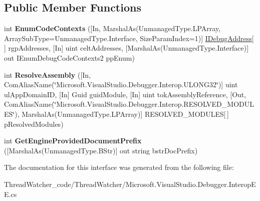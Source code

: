 \subsection*{Public Member Functions}
\begin{DoxyCompactItemize}
\item 
\hypertarget{interface_microsoft_1_1_visual_studio_1_1_debugger_1_1_interop_e_e_1_1_i_debug_engine_symbol_provider_services2_ad5df187c3c5f0352d16e2c643e3d9eb9}{int {\bfseries Enum\+Code\+Contexts} (\mbox{[}In, Marshal\+As(Unmanaged\+Type.\+L\+P\+Array, Array\+Sub\+Type=Unmanaged\+Type.\+Interface, Size\+Param\+Index=1)\mbox{]} \hyperlink{interface_microsoft_1_1_visual_studio_1_1_debugger_1_1_interop_e_e_1_1_i_debug_address}{I\+Debug\+Address}\mbox{[}$\,$\mbox{]} rgp\+Addresses, \mbox{[}In\mbox{]} uint celt\+Addresses, \mbox{[}Marshal\+As(Unmanaged\+Type.\+Interface)\mbox{]} out I\+Enum\+Debug\+Code\+Contexts2 pp\+Enum)}\label{interface_microsoft_1_1_visual_studio_1_1_debugger_1_1_interop_e_e_1_1_i_debug_engine_symbol_provider_services2_ad5df187c3c5f0352d16e2c643e3d9eb9}

\item 
\hypertarget{interface_microsoft_1_1_visual_studio_1_1_debugger_1_1_interop_e_e_1_1_i_debug_engine_symbol_provider_services2_a929a19225cb0ac7acb7fe98a116450b8}{int {\bfseries Resolve\+Assembly} (\mbox{[}In, Com\+Alias\+Name(\char`\"{}Microsoft.\+Visual\+Studio.\+Debugger.\+Interop.\+U\+L\+O\+N\+G32\char`\"{})\mbox{]} uint ul\+App\+Domain\+I\+D, \mbox{[}In\mbox{]} Guid guid\+Module, \mbox{[}In\mbox{]} uint tok\+Assembly\+Reference, \mbox{[}Out, Com\+Alias\+Name(\char`\"{}Microsoft.\+Visual\+Studio.\+Debugger.\+Interop.\+R\+E\+S\+O\+L\+V\+E\+D\+\_\+\+M\+O\+D\+U\+L\+E\+S\char`\"{}), Marshal\+As(Unmanaged\+Type.\+L\+P\+Array)\mbox{]} R\+E\+S\+O\+L\+V\+E\+D\+\_\+\+M\+O\+D\+U\+L\+E\+S\mbox{[}$\,$\mbox{]} p\+Resolved\+Modules)}\label{interface_microsoft_1_1_visual_studio_1_1_debugger_1_1_interop_e_e_1_1_i_debug_engine_symbol_provider_services2_a929a19225cb0ac7acb7fe98a116450b8}

\item 
\hypertarget{interface_microsoft_1_1_visual_studio_1_1_debugger_1_1_interop_e_e_1_1_i_debug_engine_symbol_provider_services2_a4aa45b21ed85b20fd67862f36e6dc414}{int {\bfseries Get\+Engine\+Provided\+Document\+Prefix} (\mbox{[}Marshal\+As(Unmanaged\+Type.\+B\+Str)\mbox{]} out string bstr\+Doc\+Prefix)}\label{interface_microsoft_1_1_visual_studio_1_1_debugger_1_1_interop_e_e_1_1_i_debug_engine_symbol_provider_services2_a4aa45b21ed85b20fd67862f36e6dc414}

\end{DoxyCompactItemize}


The documentation for this interface was generated from the following file\+:\begin{DoxyCompactItemize}
\item 
Thread\+Watcher\+\_\+code/\+Thread\+Watcher/Microsoft.\+Visual\+Studio.\+Debugger.\+Interop\+E\+E.\+cs\end{DoxyCompactItemize}

